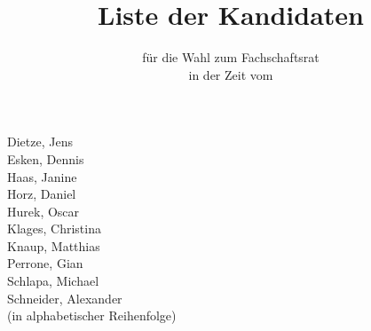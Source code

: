 \documentclass[a4paper,10pt]{scrartcl}
\title{Liste der Kandidaten}
\subtitle{für die Wahl zum Fachschaftsrat \fach \\ in der Zeit vom \zeit}
\date{}
\begin{document}
\pagestyle{empty}
\thispagestyle{empty}
\renewcommand{\titlepagestyle}{empty}

\maketitle

\begin{center}
\Huge
Dietze, Jens\\
Esken, Dennis\\
Haas, Janine\\
Horz, Daniel\\
Hurek, Oscar\\
Klages, Christina\\
Knaup, Matthias\\
Perrone, Gian\\
Schlapa, Michael\\
Schneider, Alexander\\
\small
(in alphabetischer Reihenfolge)
\end{center}
\end{document}
